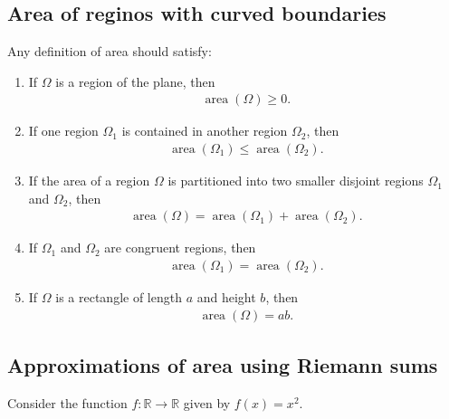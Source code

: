 \documentclass{report}
\begin{document}
		\subsection{Area of reginos with curved boundaries}

			Any definition of area should satisfy:
				\begin{enumerate}
					\item If $\Omega$ is a region of the plane, then
						\begin{align*}
							\operatorname{area}(\Omega) \geq 0.
						\end{align*}
					\item If one region $\Omega_1$ is contained in another region $\Omega_2$, then
						\begin{align*}
							\operatorname{area}(\Omega_1) \leq \operatorname{area}(\Omega_2).
						\end{align*}
					\item If the area of a region $\Omega$ is partitioned into two smaller disjoint regions $\Omega_1$ and $\Omega_2$, then
						\begin{align*}
							\operatorname{area}(\Omega) = \operatorname{area}(\Omega_1) + \operatorname{area}(\Omega_2).
						\end{align*}
					\item If $\Omega_1$ and $\Omega_2$ are congruent regions, then
						\begin{align*}
							\operatorname{area}(\Omega_1) = \operatorname{area}(\Omega_2).
						\end{align*}
					\item If $\Omega$ is a rectangle of length $a$ and height $b$, then
						\begin{align*}
							\operatorname{area}(\Omega) = ab.
						\end{align*}
				\end{enumerate}

		\subsection{Approximations of area using Riemann sums}

			Consider the function $f:\mathbb{R} \to \mathbb{R}$ given by $f(x) = x^2$.
\end{document}
